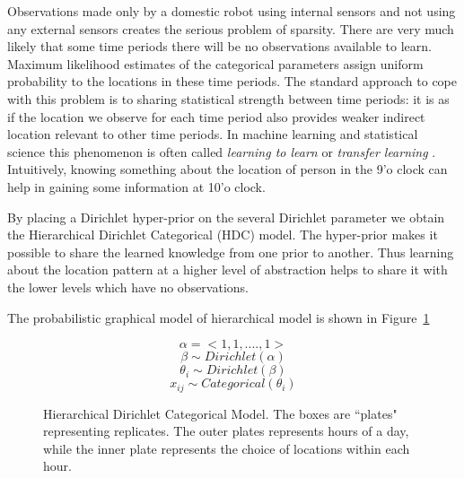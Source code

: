 Observations made only by a domestic robot using internal sensors and not using any external sensors creates the serious problem of sparsity. There are very much likely that some time periods there will be no observations available to learn. Maximum likelihood estimates of the categorical parameters assign uniform probability to the locations in these time periods. The standard approach to cope with this problem is to sharing statistical strength between time periods: it is as if the location we observe for each time period also provides weaker indirect location relevant to other time periods. In machine learning and statistical science this phenomenon is often called \emph{learning to learn} or \emph{transfer learning} \citep{kruschke2014doing}. Intuitively, knowing something about the location of person in the 9'o clock can help in gaining some information at 10'o clock. 

By placing a Dirichlet hyper-prior on the several Dirichlet parameter we obtain the  Hierarchical Dirichlet Categorical  (HDC) model. The hyper-prior makes it possible to share the learned knowledge from one prior to another. Thus learning about the location pattern at a higher level of abstraction helps to share it with the lower levels which have no observations.

The probabilistic graphical model of  hierarchical model is shown in Figure~\ref{hdcm}

\noindent
\begin{figure}[htp]

\begin{minipage}{0.3\textwidth}
\centering


\end{minipage}%
\begin{minipage}{0.7\textwidth}

\begin{equation*}
	\alpha = <1, 1, .... , 1 > 
\end{equation*}
\begin{equation*}
	\beta \sim Dirichlet (\alpha)
\end{equation*}
\begin{equation*}
	\theta_i  \sim Dirichlet (\beta)
\end{equation*}
\begin{equation*}
	x_{ij} \sim Categorical (\theta_i)
\end{equation*}
\end{minipage}
\caption[Hierarchical dirichlet categorical graphical model representation]{Hierarchical Dirichlet Categorical Model. The boxes are ``plates" representing replicates. The outer plates represents hours of a day, while the inner plate represents the choice of locations within each hour.}
\label{hdcm}
\end{figure}


